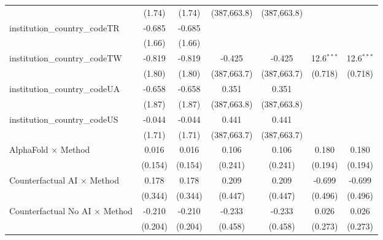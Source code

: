 \begin{tabular}{lcccccc}
                                         & (1.74)        & (1.74)        & (387,663.8)   & (387,663.8)   &               &   \\   
   institution\_country\_codeTR          & -0.685        & -0.685        &               &               &               &   \\   
                                         & (1.66)        & (1.66)        &               &               &               &   \\   
   institution\_country\_codeTW          & -0.819        & -0.819        & -0.425        & -0.425        & 12.6$^{***}$  & 12.6$^{***}$\\   
                                         & (1.80)        & (1.80)        & (387,663.7)   & (387,663.7)   & (0.718)       & (0.718)\\   
   institution\_country\_codeUA          & -0.658        & -0.658        & 0.351         & 0.351         &               &   \\   
                                         & (1.87)        & (1.87)        & (387,663.8)   & (387,663.8)   &               &   \\   
   institution\_country\_codeUS          & -0.044        & -0.044        & 0.441         & 0.441         &               &   \\   
                                         & (1.71)        & (1.71)        & (387,663.7)   & (387,663.7)   &               &   \\   
   AlphaFold $\times$ Method             & 0.016         & 0.016         & 0.106         & 0.106         & 0.180         & 0.180\\   
                                         & (0.154)       & (0.154)       & (0.241)       & (0.241)       & (0.194)       & (0.194)\\   
   Counterfactual AI $\times$ Method     & 0.178         & 0.178         & 0.209         & 0.209         & -0.699        & -0.699\\   
                                         & (0.344)       & (0.344)       & (0.447)       & (0.447)       & (0.496)       & (0.496)\\   
   Counterfactual No AI $\times$ Method  & -0.210        & -0.210        & -0.233        & -0.233        & 0.026         & 0.026\\   
                                         & (0.204)       & (0.204)       & (0.458)       & (0.458)       & (0.273)       & (0.273)\\   

\end{tabular}
